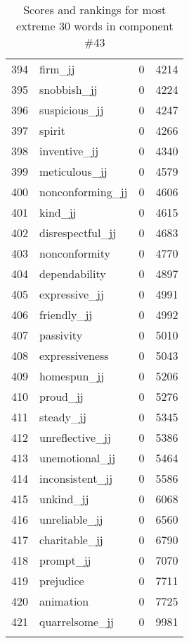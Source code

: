 \begin{longtable}[!htbp]{| rlr@{.}l |}
    394 & firm\_jj & 0 & 4214 \\
    395 & snobbish\_jj & 0 & 4224 \\
    396 & suspicious\_jj & 0 & 4247 \\
    397 & spirit & 0 & 4266 \\
    398 & inventive\_jj & 0 & 4340 \\
    399 & meticulous\_jj & 0 & 4579 \\
    400 & nonconforming\_jj & 0 & 4606 \\
    401 & kind\_jj & 0 & 4615 \\
    402 & disrespectful\_jj & 0 & 4683 \\
    403 & nonconformity & 0 & 4770 \\
    404 & dependability & 0 & 4897 \\
    405 & expressive\_jj & 0 & 4991 \\
    406 & friendly\_jj & 0 & 4992 \\
    407 & passivity & 0 & 5010 \\
    408 & expressiveness & 0 & 5043 \\
    409 & homespun\_jj & 0 & 5206 \\
    410 & proud\_jj & 0 & 5276 \\
    411 & steady\_jj & 0 & 5345 \\
    412 & unreflective\_jj & 0 & 5386 \\
    413 & unemotional\_jj & 0 & 5464 \\
    414 & inconsistent\_jj & 0 & 5586 \\
    415 & unkind\_jj & 0 & 6068 \\
    416 & unreliable\_jj & 0 & 6560 \\
    417 & charitable\_jj & 0 & 6790 \\
    418 & prompt\_jj & 0 & 7070 \\
    419 & prejudice & 0 & 7711 \\
    420 & animation & 0 & 7725 \\
    421 & quarrelsome\_jj & 0 & 9981 \\
    \hline
    \caption{Scores and rankings for most extreme 30 words in component \#43} \\
\end{longtable}
